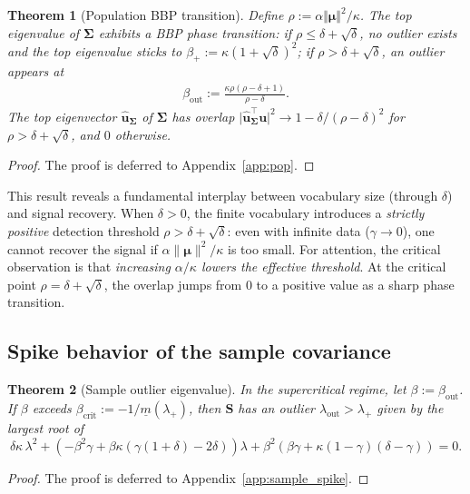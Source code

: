 \documentclass{article}
\def\vmu{{\bm{\mu}}}
\def\vu{{\bm{u}}}
\def\mS{{\bm{S}}}
\def\mSigma{{\bm{\Sigma}}}
\newtheorem{theorem}{Theorem}
\begin{document}
\begin{theorem}[Population BBP transition]\label{thm:pop_bbp}
    Define $\rho:= \alpha \Vert \vmu \Vert^2 / \kappa$. The top eigenvalue of $\mSigma$ exhibits a BBP phase transition: if $\rho\leq \delta + \sqrt{\delta}$, no outlier exists and the top eigenvalue sticks to $\beta_+:= \kappa (1 + \sqrt{\delta})^2$; if $\rho> \delta + \sqrt{\delta}$, an outlier appears at
        \begin{align}\label{eq:beta_out}
            \beta_\mathrm{out} := \frac{\kappa\rho(\rho-\delta +1)}{\rho - \delta}.
        \end{align}
    The top eigenvector $\hat \vu_\mSigma$ of $\mSigma$ has overlap $\vert \hat{\vu}_\mSigma^\top \vu \vert^2 \to 1 - \delta/(\rho-\delta)^2$ for $\rho> \delta + \sqrt{\delta}$, and $0$ otherwise.
\end{theorem}
\begin{proof}
The proof is deferred to Appendix~\ref{app:pop}.
\end{proof}

This result reveals a fundamental interplay between vocabulary size (through $\delta$) and signal recovery. When $\delta > 0$, the finite vocabulary introduces a \emph{strictly positive} detection threshold $\rho > \delta + \sqrt{\delta}$: even with infinite data ($\gamma\to 0$), one cannot recover the signal if $\alpha\|\vmu\|^2/\kappa$ is too small. For attention, the critical observation is that \emph{increasing $\alpha/\kappa$ lowers the effective threshold}. At the critical point $\rho = \delta + \sqrt{\delta}$, the overlap jumps from $0$ to a positive value as a sharp phase transition.


\subsection{Spike behavior of the sample covariance}\label{sec:spike_sample}

\begin{theorem}[Sample outlier eigenvalue]\label{thm:sample_spike}
    In the supercritical regime, let $\beta := \beta_\mathrm{out}$. If $\beta$ exceeds $\beta_\mathrm{crit} := -1/\underline{m}(\lambda_+)$, then $\mS$ has an outlier $\lambda_\mathrm{out} > \lambda_+$ given by the largest root of
    \begin{equation}\label{eq:lambda_quad}
        \delta\kappa\,\lambda^2 + \left(-\beta^2\gamma + \beta\kappa(\gamma(1+\delta) - 2\delta)\right)\lambda + \beta^2\left(\beta\gamma + \kappa(1-\gamma)(\delta - \gamma)\right) = 0.
    \end{equation}
\end{theorem}
\begin{proof}
The proof is deferred to Appendix~\ref{app:sample_spike}.
\end{proof}
\end{document}
